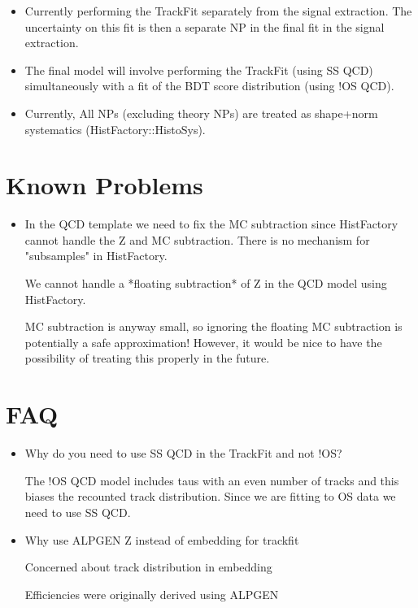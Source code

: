 \documentclass{article}
\begin{document}
\begin{itemize}
\item Currently performing the TrackFit separately from the signal extraction.
The uncertainty on this fit is then a separate NP in the final fit in the
signal extraction.

\item The final model will involve performing the TrackFit (using SS QCD)
simultaneously with a fit of the BDT score distribution (using !OS QCD).

\item Currently, All NPs (excluding theory NPs) are treated as shape+norm
systematics (HistFactory::HistoSys).

\end{itemize}

\section{Known Problems}

\begin{itemize}
\item In the QCD template we need to fix the MC subtraction
  since HistFactory cannot handle the Z and MC subtraction. There is no
  mechanism for "subsamples" in HistFactory.

  We cannot handle a *floating subtraction* of Z in the QCD model using HistFactory.

  MC subtraction is anyway small, so ignoring the floating MC subtraction is
  potentially a safe approximation! However, it would be nice to have the
  possibility of treating this properly in the future.
\end{itemize}


\section{FAQ}

\begin{itemize}
    \item Why do you need to use SS QCD in the TrackFit and not !OS?

   The !OS QCD model includes taus with an even number of tracks and this
   biases the recounted track distribution. Since we are fitting to OS data we
   need to use SS QCD.

   \item Why use ALPGEN Z instead of embedding for trackfit

       Concerned about track distribution in embedding

       Efficiencies were originally derived using ALPGEN
\end{itemize}
\end{document}

